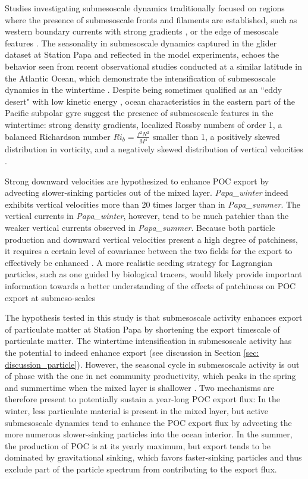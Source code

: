 \documentclass[article,linenumbers]{agujournal2018}
\begin{document}
Studies investigating submesoscale dynamics traditionally focused on regions where the presence of submesoscale fronts and filaments are established, such as western boundary currents with strong gradients \citep{Dasaro_2011, Thomas_2013}, or the edge of mesoscale features \citep{vanHaren_2006,Waite_2016}. The seasonality in submesoscale dynamics captured in the glider dataset at Station Papa and reflected in the model experiments, echoes the behavior seen from recent observational studies conducted at a similar latitude in the Atlantic Ocean, which demonstrate the intensification of submesoscale dynamics in the wintertime \citep{Thompson_2016, Buckingham_2016}. Despite being sometimes qualified as an ``eddy desert" with low kinetic energy \citep{Chelton_2011}, ocean characteristics in the eastern part of the Pacific subpolar gyre suggest the presence of submesoscale features in the wintertime: strong density gradients, localized Rossby numbers of order 1, a balanced Richardson number $Ri_b = \frac{f^2N^2}{M^4}$ smaller than 1, a positively skewed distribution in vorticity, and a negatively skewed distribution of vertical velocities \citep[see Figure \ref{fig: dynamics};][]{Thomas_2013b,Rudnick_2001, Buckingham_2016}.

Strong downward velocities are hypothesized to enhance POC export by advecting slower-sinking particles out of the mixed layer. \textit{Papa\_winter} indeed exhibits vertical velocities more than 20 times larger than in \textit{Papa\_summer}. The vertical currents in \textit{Papa\_winter}, however, tend to be much patchier than the weaker vertical currents observed in \textit{Papa\_summer}. Because both particle production and downward vertical velocities present a high degree of patchiness, it requires a certain level of covariance between the two fields for the export to effectively be enhanced \citep{Mahadevan_2012}. A more realistic seeding strategy for Lagrangian particles, such as one guided by biological tracers, would likely provide important information towards a better understanding of the effects of patchiness on POC export at submeso-scales

The hypothesis tested in this study is that submesoscale activity enhances export of particulate matter at Station Papa by shortening the export timescale of particulate matter. The wintertime intensification in submesoscale activity has the potential to indeed enhance export (see discussion in Section \ref{sec: discussion_particle}). However, the seasonal cycle in submesoscale activity is out of phase with the one in net community productivity, which peaks in the spring and summertime when the mixed layer is shallower \citep{Plant_2016}. Two mechanisms are therefore present to potentially sustain a year-long POC export flux: In the winter, less particulate material is present in the mixed layer, but active submesoscale dynamics tend to enhance the POC export flux by advecting the more numerous slower-sinking particles into the ocean interior. In the summer, the production of POC is at its yearly maximum, but export tends to be dominated by gravitational sinking, which favors faster-sinking particles and thus exclude part of the particle spectrum from contributing to the export flux.
\end{document}
